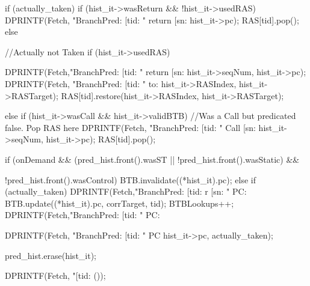 \begin{DoxyCode}
{{        if (actually_taken) {
            if (hist_it->wasReturn && !hist_it->usedRAS) {
                 DPRINTF(Fetch, "BranchPred: [tid: %
                           "  return [sn:%
                            hist_it->pc);
                 RAS[tid].pop();
            }
        } else {
           //Actually not Taken
           if (hist_it->usedRAS) {
                DPRINTF(Fetch,"BranchPred: [tid: %
                           "  return [sn:%
                           hist_it->seqNum, hist_it->pc);
                DPRINTF(Fetch, "BranchPred: [tid:%
                               " to: %
                              hist_it->RASIndex, hist_it->RASTarget);
                RAS[tid].restore(hist_it->RASIndex, hist_it->RASTarget);

           } else if (hist_it->wasCall && hist_it->validBTB) {
                 //Was a Call but predicated false. Pop RAS here
                 DPRINTF(Fetch, "BranchPred: [tid: %
                           "  Call [sn:%
                           hist_it->seqNum, hist_it->pc);
                 RAS[tid].pop();
           }
        }
                if (onDemand && 
                    (pred_hist.front().wasST || !pred_hist.front().wasStatic) && 
      
                        !pred_hist.front().wasControl) {
                        BTB.invalidate((*hist_it).pc);
                } else  if (actually_taken) {
                        DPRINTF(Fetch,"BranchPred: [tid: %
      r [sn:%
                          " PC: %
                        BTB.update((*hist_it).pc, corrTarget, tid);
                        BTBLookups++;
            DPRINTF(Fetch,"BranchPred: [tid: %
                            " PC: %
                }

        DPRINTF(Fetch, "BranchPred: [tid:%
                       " PC %
                       hist_it->pc, actually_taken);

        pred_hist.erase(hist_it);

        DPRINTF(Fetch, "[tid:%
      ());
    }
}
\end{DoxyCode}
